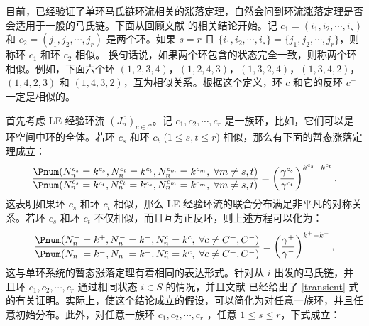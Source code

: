 目前，已经验证了单环马氏链环流相关的涨落定理，自然会问到环流涨落定理是否会适用于一般的马氏链。下面从回顾文献 \cite{jia2016cycle} 的相关结论开始。记 $c_1=(i_1,i_2,\cdots,i_s)$ 和 $c_2=(j_1,j_2,\cdots,j_r)$ 是两个环。如果 $s=r$ 且 $\{i_1,i_2,\cdots,i_s\}=\{j_1,j_2,\cdots,j_r\}$，则称环 $c_1$ 和环 $c_2$ 相似。
换句话说，如果两个环包含的状态完全一致，则称两个环相似。例如，下面六个环 $(1,2,3,4)$，$(1,2,4,3)$，$(1,3,2,4)$，$(1,3,4,2)$，$(1,4,2,3)$ 和 $(1,4,3,2)$，互为相似关系。根据这个定义，环 $c$ 和它的反环 $c^-$ 一定是相似的。

首先考虑 LE 经验环流 $(J^c_n)_{c\in\mathcal{C}}$。记 $c_1,c_2,\cdots,c_r$ 是一族环，比如，它们可以是环空间中环的全体。若环 $c_s$ 和环 $c_t$ ($1\le s,t\le r$) 相似，那么有下面的暂态涨落定理成立：
\begin{equation}\label{transient}
    \frac{\Pnum(N^{c_s}_n=k^{c_s},N^{c_t}_n=k^{c_t},N^{c_m}_n=k^{c_m},\;\forall m\neq s,t)}
    {\Pnum(N^{c_s}_n=k^{c_t},N^{c_t}_n=k^{c_s},N^{c_m}_n=k^{c_m},\;\forall m\neq s,t)}
    = \left(\frac{\gamma^{c_s}}{\gamma^{c_t}}\right)^{k^{c_s}-k^{c_t}}.
\end{equation}
这表明如果环 $c_s$ 和环 $c_t$ 相似，那么 LE 经验环流的联合分布满足非平凡的对称关系。若环 $c_s$ 和环 $c_t$ 不仅相似，而且互为正反环，则上述方程可以化为：
\begin{equation*}
    \frac{\Pnum(N^+_n=k^+,N^-_n=k^-,N^c_n=k^c,\;\forall c\neq C^+,C^-)}
    {\Pnum(N^+_n=k^-,N^-_n=k^+,N^c_n=k^c,\;\forall c\neq C^+,C^-)}
    = \left(\frac{\gamma^+}{\gamma^-}\right)^{k^+-k^-},
\end{equation*}
这与单环系统的暂态涨落定理有着相同的表达形式。针对从 $i$ 出发的马氏链，并且环 $c_1,c_2,\cdots,c_r$ 通过相同状态 $i\in S$ 的情况，并且文献 \cite{jia2016cycle} 已经给出了 \eqref{transient} 式的有关证明。实际上，使这个结论成立的假设，可以简化为对任意一族环，并且任意初始分布。此外，对任意一族环  $c_1,c_2,\cdots,c_r$ ，任意 $1\le s\le r$，下式成立：
